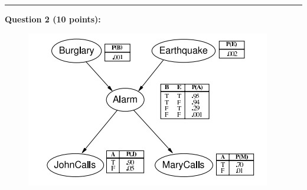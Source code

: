 \documentclass[12pt]{article}
\begin{document}
\rule{\linewidth}{0.4pt}
\vspace{.2cm}

\textbf{Question 2 (10 points):}

\begin{figure}[h]
    \centering
    \includegraphics{images/probdescrips/prob2.jpg}
	\caption{}
	\label{fig:prob2}
\end{figure}
\end{document}
